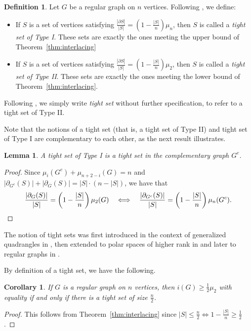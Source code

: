 \documentclass[a4paper,11pt]{article}
\newtheorem{corollary}[theorem]{Corollary}
\newtheorem{lemma}[theorem]{Lemma}
\theoremstyle{definition}
\newtheorem{definition}[theorem]{Definition}
\begin{document}
\begin{definition}\label{def:tight}
Let $G$ be a regular graph on $n$ vertices. Following \cite{intriguing}, we define:
\begin{itemize}
    \item If $S$ is a set of vertices satisfying \(\frac{|\partial S|}{|S|}=\left(1-\frac{|S|}{n}\right)\mu_n\), then $S$ is called a \emph{tight set of Type I}. These sets are exactly the ones meeting the upper bound of Theorem~\ref{thm:interlacing}
    \item  If $S$ is a set of vertices satisfying  $\frac{|\partial S|}{|S|}=(1-\frac{|S|}{n})\mu_2$, then $S$ is called a \emph{tight set of Type II}. These sets are exactly the ones meeting the lower bound of Theorem~\ref{thm:interlacing}. 
\end{itemize}


Following \cite{Bamberg2007,Bamberg2009,StronglyBrouwer,Drudge,Payne}, we simply write \emph{tight set} without further specification, to refer to a tight set of Type II.
\end{definition}

Note that the notions of a tight set (that is, a tight set of Type II) and tight set of Type I are complementary to each other, as the next result illustrates.

\begin{lemma}\label{lem:tightcomplement}
    A tight set of Type I is a tight set in the complementary graph $G^c$.
\end{lemma}
\begin{proof}
    Since \(\mu_i(G^c)+\mu_{n+2-i}(G)=n\) and \(|\partial_{G^c}(S)|+|\partial_G(S)|=|S|\cdot\left(n-|S|\right)\), we have that
    \[\frac{|\partial_G(S)|}{|S|}=\left(1-\frac{|S|}{n}\right)\mu_2(G)\quad\Longleftrightarrow\quad\frac{|\partial_{G^c}(S)|}{|S|}=\left(1-\frac{|S|}{n}\right)\mu_n(G^c).\qedhere\]
\end{proof}

The notion of tight sets was first introduced in the context of generalized quadrangles in \cite{Payne}, then extended to polar spaces of higher rank in \cite{Drudge} and later to regular graphs in \cite{intriguing}. 

By definition of a tight set, we have the following.

\begin{corollary}\label{cor:tight}
    If \(G\) is a regular graph on $n$ vertices, then \(i(G) \geq\frac12\mu_2\) with equality if and only if there is a tight set of size $\frac{n}{2}$.  
\end{corollary}
\begin{proof}
    This follows from Theorem~\ref{thm:interlacing} since \(|S|\leq\frac{n}2\Leftrightarrow1-\frac{|S|}{n} \ge \frac 12\).
\end{proof}
\end{document}
